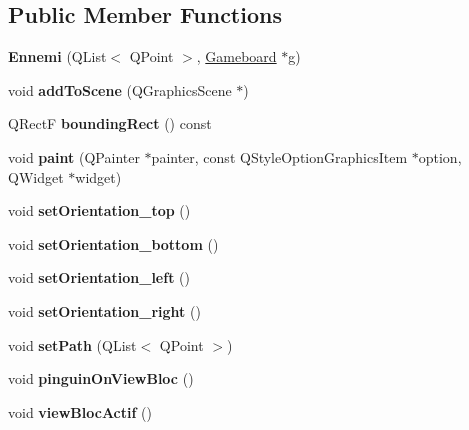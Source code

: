 \subsection*{Public Member Functions}
\begin{DoxyCompactItemize}
\item 
\hypertarget{class_ennemi_af86e9134a1cfd8d878305924702b9d7a}{}{\bfseries Ennemi} (Q\+List$<$ Q\+Point $>$, \hyperlink{class_gameboard}{Gameboard} $\ast$g)\label{class_ennemi_af86e9134a1cfd8d878305924702b9d7a}

\item 
\hypertarget{class_ennemi_ae62d1dcf274319710e7ac4495c95a221}{}void {\bfseries add\+To\+Scene} (Q\+Graphics\+Scene $\ast$)\label{class_ennemi_ae62d1dcf274319710e7ac4495c95a221}

\item 
\hypertarget{class_ennemi_aa00ff90bbb5d71456a23673e77c41bb4}{}Q\+Rect\+F {\bfseries bounding\+Rect} () const \label{class_ennemi_aa00ff90bbb5d71456a23673e77c41bb4}

\item 
\hypertarget{class_ennemi_afbdea6c2e62c2065694a32db0f049325}{}void {\bfseries paint} (Q\+Painter $\ast$painter, const Q\+Style\+Option\+Graphics\+Item $\ast$option, Q\+Widget $\ast$widget)\label{class_ennemi_afbdea6c2e62c2065694a32db0f049325}

\item 
\hypertarget{class_ennemi_a7c509f048996eecb4ee768a044825d15}{}void {\bfseries set\+Orientation\+\_\+top} ()\label{class_ennemi_a7c509f048996eecb4ee768a044825d15}

\item 
\hypertarget{class_ennemi_ab3bbc6381307320c22b1686c5bc59d93}{}void {\bfseries set\+Orientation\+\_\+bottom} ()\label{class_ennemi_ab3bbc6381307320c22b1686c5bc59d93}

\item 
\hypertarget{class_ennemi_ac455b7c41a46dc42a27841b9c566e329}{}void {\bfseries set\+Orientation\+\_\+left} ()\label{class_ennemi_ac455b7c41a46dc42a27841b9c566e329}

\item 
\hypertarget{class_ennemi_a4e99225c7a632efceebba66996d7d9ee}{}void {\bfseries set\+Orientation\+\_\+right} ()\label{class_ennemi_a4e99225c7a632efceebba66996d7d9ee}

\item 
\hypertarget{class_ennemi_a482e9c5ccc0cf1c3aa4e83f32f3eedb1}{}void {\bfseries set\+Path} (Q\+List$<$ Q\+Point $>$)\label{class_ennemi_a482e9c5ccc0cf1c3aa4e83f32f3eedb1}

\item 
\hypertarget{class_ennemi_a6811b0a25a92ec210750072b83d1f74e}{}void {\bfseries pinguin\+On\+View\+Bloc} ()\label{class_ennemi_a6811b0a25a92ec210750072b83d1f74e}

\item 
\hypertarget{class_ennemi_ad4861b8a3ad9d4819d3716ac3d0e8501}{}void {\bfseries view\+Bloc\+Actif} ()\label{class_ennemi_ad4861b8a3ad9d4819d3716ac3d0e8501}

\end{DoxyCompactItemize}

